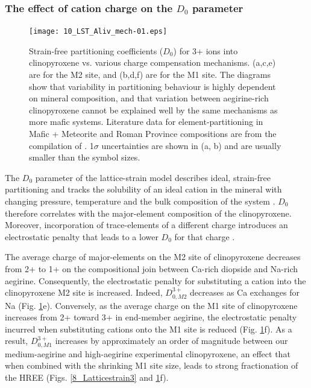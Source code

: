 \documentclass[final,authoryear,3p,times,twocolumn]{elsarticle}
\begin{document}

\subsubsection{The effect of cation charge on the $D_0$ parameter}
 \begin{figure}[tp]
        \begin{center}
        \texttt{[image: 10\_LST\_Aliv\_mech-01.eps]}
        
        \caption[Strain-free partition coefficients ($D_0$) for 3+ ions into clinopyroxene vs. various charge compensation mechanisms.]{Strain-free partitioning coefficients ($D_0$) for 3+ ions into clinopyroxene vs. various charge compensation mechanisms. (a,c,e) are for the M2 site, and (b,d,f) are for the M1 site. The diagrams show that variability in partitioning behaviour is highly dependent on mineral composition, and that variation between aegirine-rich clinopyroxene cannot be explained well by the same mechanisms as more mafic systems. Literature data for element-partitioning in Mafic + Meteorite and Roman Province compositions are from the compilation of \citet{Bedard2014}. 1$\sigma$ uncertainties are shown in (a, b) and are usually smaller than the symbol sizes.}
        \label{10_D0_Mech}
        \end{center}
        \end{figure}

	The $D_0$ parameter of the lattice-strain model describes ideal, strain-free partitioning and tracks the solubility of an ideal cation in the mineral with changing pressure, temperature and the bulk composition of the system \citep{Wood2014}. $D_0$ therefore correlates with the major-element composition of the clinopyroxene. Moreover, incorporation of trace-elements of a different charge introduces an electrostatic penalty that leads to a lower $D_0$ for that charge \citep{Wood2001charge, Wood2003}.
	
	The average charge of major-elements on the M2 site of clinopyroxene decreases from 2+ to 1+ on the compositional join between Ca-rich diopside and Na-rich aegirine. Consequently, the electrostatic penalty for substituting a  cation into the clinopyroxene M2 site is increased. Indeed, $D_{0, M2}^{3+}$ decreases as Ca exchanges for Na (Fig. \ref{10_D0_Mech}e).
	Conversely, as the average charge on the M1 site of clinopyroxene increases from 2+ toward 3+ in end-member aegirine, the electrostatic penalty incurred when substituting  cations onto the M1 site is reduced (Fig. \ref{10_D0_Mech}f). As a result, $D_{0, M1}^{3+}$ increases by approximately an order of magnitude between our medium-aegirine and high-aegirine experimental clinopyroxene, an effect that when combined with the shrinking M1 site size, leads to strong fractionation of the HREE (Figs. \ref{8_Latticestrain3} and \ref{10_D0_Mech}f).
\end{document}
